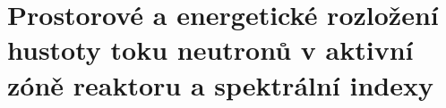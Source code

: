 \section[Prostorové a energetické rozložení hustoty toku, spektrální indexy]{Prostorové a energetické rozložení hustoty toku neutronů v aktivní zóně reaktoru a spektrální indexy}

